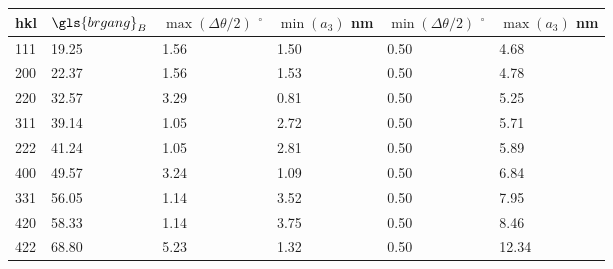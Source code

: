 \begin{tabularx}{\linewidth}{|X|X|X|X|X|X|}
\hline
hkl & \( \gls{brgang}_B \) & \( \max \left( \Delta \theta / 2 \right) \) \(^{\circ}\) & \( \min \left( a_3 \right) \) nm & \( \min \left( \Delta \theta / 2 \right) \) \(^{\circ}\) & \( \max \left( a_3 \right) \) nm \\
\hline
111 & 19.25 & 1.56 & 1.50 & 0.50 & 4.68 \\
\hline
200 & 22.37 & 1.56 & 1.53 & 0.50 & 4.78 \\
\hline
220 & 32.57 & 3.29 & 0.81 & 0.50 & 5.25 \\
\hline
311 & 39.14 & 1.05 & 2.72 & 0.50 & 5.71 \\
\hline
222 & 41.24 & 1.05 & 2.81 & 0.50 & 5.89 \\
\hline
400 & 49.57 & 3.24 & 1.09 & 0.50 & 6.84 \\
\hline
331 & 56.05 & 1.14 & 3.52 & 0.50 & 7.95 \\
\hline
420 & 58.33 & 1.14 & 3.75 & 0.50 & 8.46 \\
\hline
422 & 68.80 & 5.23 & 1.32 & 0.50 & 12.34 \\
\hline
\end{tabularx}